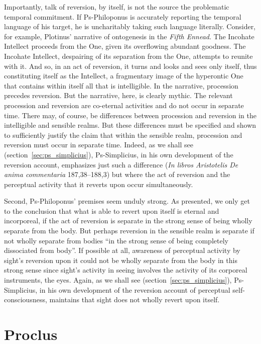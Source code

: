 Importantly, talk of reversion, by itself, is not the source the problematic temporal commitment. If Ps-Philoponus is accurately reporting the temporal language of his target, he is uncharitably taking such language literally. Consider, for example, Plotinus' narrative of ontogenesis in the \emph{Fifth Ennead}. The Incohate Intellect proceeds from the One, given its overflowing abundant goodness. The Incohate Intellect, despairing of its separation from the One, attempts to reunite with it. And so, in an act of reversion, it turns and looks and sees only itself, thus constituting itself as the Intellect, a fragmentary image of the hyperontic One that contains within itself all that is intelligible. In the narrative, procession precedes reversion. But the narrative, here, is clearly mythic. The relevant procession and reversion are co-eternal activities and do not occur in separate time. There may, of course, be differences between procession and reversion in the intelligible and sensible realms. But these differences must be specified and shown to sufficiently justify the claim that within the sensible realm, procession and reversion must occur in separate time. Indeed, as we shall see (section~\ref{sec:ps_simplicius}), Ps-Simplicius, in his own development of the reversion account, emphasizes just such a difference (\emph{In libros Aristotelis De anima commentaria} 187,38–188,3) but where the act of reversion and the perceptual activity that it reverts upon occur simultaneously.

Second, Ps-Philoponus' premises seem unduly strong. As presented, we only get to the conclusion that what is able to revert upon itself is eternal and incorporeal, if the act of reversion is separate in the strong sense of being wholly separate from the body. But perhaps reversion in the sensible realm is separate if not wholly separate from bodies \citep[159]{Bernard:1987hc} ``in the strong sense of being completely dissociated from body''. If possible at all, awareness of perceptual activity by sight's reversion upon it could not be wholly separate from the body in this strong sense since sight's activity in seeing involves the activity of its corporeal instruments, the eyes. Again, as we shall see (section~\ref{sec:ps_simplicius}), Ps-Simplicius, in his own development of the reversion account of perceptual self-consciousness, maintains that sight does not wholly revert upon itself.


\section{Proclus} %
\label{sec:proclus}


